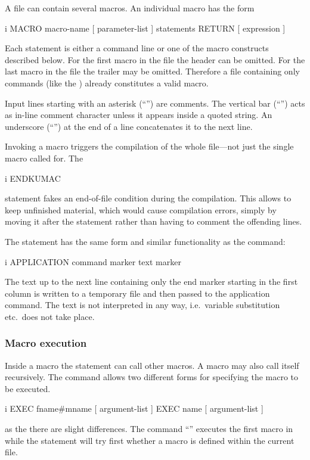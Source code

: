 A  file can contain several macros.
An individual macro has the form
\begin{Gray}{i}
MACRO macro-name  [ parameter-list ]
   statements
RETURN [ expression ]
\end{Gray}
Each statement is either a command line or one of the macro constructs
described below. 
For the first macro in the file the  header can be omitted.
For the last macro in the file the  trailer may be
omitted.
Therefore a  file containing only commands (like the
) already constitutes a valid macro.

Input lines starting with an asterisk (``\Lit{*}'') are comments.
The vertical bar (``\Lit{|}'') acts as in-line comment character unless
it appears inside a quoted string.
An underscore (``\Lit{\_}'') at the end of a line concatenates it to
the next line.

Invoking a macro triggers the compilation of the whole 
file---not just the single macro called for.
The
\begin{Gray}{i}
ENDKUMAC
\end{Gray}
statement fakes an end-of-file condition during the compilation.
This allows to keep unfinished material, which would cause compilation
errors, simply by moving it after the  statement rather
than having to comment the offending lines.

The  statement has the same form and similar functionality
as the  command:
\begin{Gray}{i}
APPLICATION  command  marker
   text
marker
\end{Gray}
The text up to the next line containing only the end marker starting
in the first column is written to a temporary file and then passed to
the application command.
The text is not interpreted in any way, i.e.\ variable substitution
etc.\ does not take place.


\subsubsection{Macro execution}

Inside a macro the  statement can call other macros.
A macro may also call itself recursively.
The  command allows two different forms for specifying the
macro to be executed.
\begin{Gray}{i}
EXEC  fname#mname  [ argument-list ]
EXEC  name  [ argument-list ]
\end{Gray}
as the   there are slight differences.
The command ``'' executes the first macro in
 while the  statement will try first
whether a macro  is defined within the current  file.

